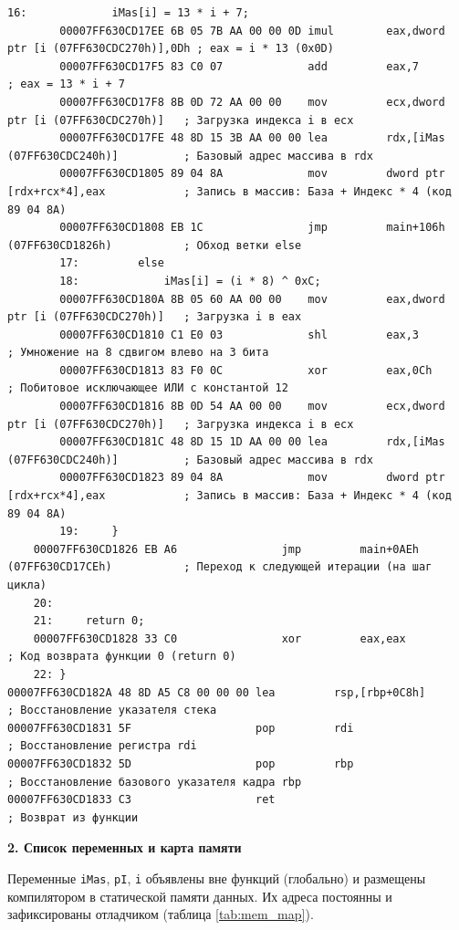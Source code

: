 \documentclass[14pt, a4paper]{extarticle}
\begin{document}
\begin{lstlisting}[language={[x86masm]Assembler}, caption={Дизассемблированный код с сопоставлением инструкциям Си}]
		16: 			iMas[i] = 13 * i + 7;
		00007FF630CD17EE 6B 05 7B AA 00 00 0D imul        eax,dword ptr [i (07FF630CDC270h)],0Dh ; eax = i * 13 (0x0D)
		00007FF630CD17F5 83 C0 07             add         eax,7                                ; eax = 13 * i + 7
		00007FF630CD17F8 8B 0D 72 AA 00 00    mov         ecx,dword ptr [i (07FF630CDC270h)]   ; Загрузка индекса i в ecx
		00007FF630CD17FE 48 8D 15 3B AA 00 00 lea         rdx,[iMas (07FF630CDC240h)]          ; Базовый адрес массива в rdx
		00007FF630CD1805 89 04 8A             mov         dword ptr [rdx+rcx*4],eax            ; Запись в массив: База + Индекс * 4 (код 89 04 8A)
		00007FF630CD1808 EB 1C                jmp         main+106h (07FF630CD1826h)           ; Обход ветки else
		17: 		else
		18: 			iMas[i] = (i * 8) ^ 0xC;
		00007FF630CD180A 8B 05 60 AA 00 00    mov         eax,dword ptr [i (07FF630CDC270h)]   ; Загрузка i в eax
		00007FF630CD1810 C1 E0 03             shl         eax,3                                ; Умножение на 8 сдвигом влево на 3 бита
		00007FF630CD1813 83 F0 0C             xor         eax,0Ch                              ; Побитовое исключающее ИЛИ с константой 12
		00007FF630CD1816 8B 0D 54 AA 00 00    mov         ecx,dword ptr [i (07FF630CDC270h)]   ; Загрузка индекса i в ecx
		00007FF630CD181C 48 8D 15 1D AA 00 00 lea         rdx,[iMas (07FF630CDC240h)]          ; Базовый адрес массива в rdx
		00007FF630CD1823 89 04 8A             mov         dword ptr [rdx+rcx*4],eax            ; Запись в массив: База + Индекс * 4 (код 89 04 8A)
		19: 	}
	00007FF630CD1826 EB A6                jmp         main+0AEh (07FF630CD17CEh)           ; Переход к следующей итерации (на шаг цикла)
	20: 
	21: 	return 0;
	00007FF630CD1828 33 C0                xor         eax,eax                              ; Код возврата функции 0 (return 0)
	22: }
00007FF630CD182A 48 8D A5 C8 00 00 00 lea         rsp,[rbp+0C8h]                       ; Восстановление указателя стека
00007FF630CD1831 5F                   pop         rdi                                  ; Восстановление регистра rdi
00007FF630CD1832 5D                   pop         rbp                                  ; Восстановление базового указателя кадра rbp
00007FF630CD1833 C3                   ret                                              ; Возврат из функции
\end{lstlisting}
     	
	\noindent \textbf{2. Список переменных и карта памяти}
	
	Переменные \texttt{iMas}, \texttt{pI}, \texttt{i} объявлены вне функций (глобально) и размещены компилятором в статической памяти данных. Их адреса постоянны и зафиксированы отладчиком (таблица \ref{tab:mem_map}).
	
\end{document}
